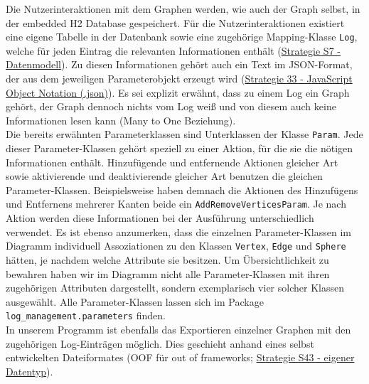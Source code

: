 \documentclass[enabledeprecatedfontcommands,fontsize=11pt,paper=a4,twoside]{scrartcl}
\newcounter{one}
\begin{document}
	Die Nutzerinteraktionen mit dem Graphen werden, wie auch der Graph selbst, in der embedded H2 Database gespeichert. Für die Nutzerinteraktionen existiert eine eigene Tabelle in der Datenbank sowie eine zugehörige Mapping-Klasse \texttt{Log}, welche für jeden Eintrag die relevanten Informationen enthält (\hyperlink{aaa}{Strategie S7 - Datenmodell}). Zu diesen Informationen gehört auch ein Text im JSON-Format, der aus dem jeweiligen Parameterobjekt erzeugt wird (\hyperlink{jjj}{Strategie 33 - JavaScript Object Notation (.json)}). Es sei explizit erwähnt, dass zu einem Log ein Graph gehört, der Graph dennoch nichts vom Log weiß und von diesem auch keine Informationen lesen kann (Many to One Beziehung). \\
	Die bereits erwähnten Parameterklassen sind Unterklassen der Klasse \texttt{Param}. Jede dieser Parameter-Klassen gehört speziell zu einer Aktion, für die sie die nötigen Informationen enthält. Hinzufügende und entfernende Aktionen gleicher Art sowie aktivierende und deaktivierende gleicher Art benutzen die gleichen Parameter-Klassen. Beispielsweise haben demnach die Aktionen des Hinzufügens und Entfernens mehrerer Kanten beide ein \texttt{AddRemoveVerticesParam}. Je nach Aktion werden diese Informationen bei der Ausführung unterschiedlich verwendet. Es ist ebenso anzumerken, dass die einzelnen Parameter-Klassen im Diagramm individuell Assoziationen zu den Klassen \texttt{Vertex}, \texttt{Edge} und \texttt{Sphere} hätten, je nachdem welche Attribute sie besitzen. Um Übersichtlichkeit zu bewahren haben wir im Diagramm nicht alle Parameter-Klassen mit ihren zugehörigen Attributen dargestellt, sondern exemplarisch vier solcher Klassen ausgewählt. Alle Parameter-Klassen lassen sich im Package \texttt{log\_management.parameters} finden. \\
	
	In unserem Programm ist ebenfalls das Exportieren einzelner Graphen mit den zugehörigen Log-Einträgen möglich. Dies geschieht anhand eines selbst entwickelten Dateiformates (OOF für \glqq out of frameworks\grqq; \hyperlink{ooo}{Strategie S43 - eigener Datentyp}). \\
	
\end{document}
